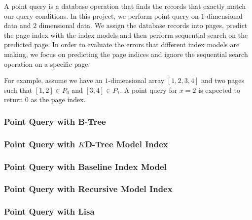 A point query is a database operation that finds the records that exactly match our query conditions. In this project, we perform point query on $1$-dimensional data and $2$ dimensional data. We assign the database records into pages, predict the page index with the index models and then perform sequential search on the predicted page. In order to evaluate the errors that different index models are making, we focus on predicting the page indices and ignore the sequential search operation on a specific page. 

\begin{mscexample}
For example, assume we have an $1$-dimensional array $[1,2,3,4]$ and two pages such that $[1,2]\in P_0$ and $[3,4]\in P_1$. A point query for $x=2$ is expected to return 0 as the page index.
\end{mscexample}

\subsubsection{Point Query with B-Tree}



\subsubsection{Point Query with $K$D-Tree Model Index}



\subsubsection{Point Query with Baseline Index Model}



\subsubsection{Point Query with Recursive Model Index}



\subsubsection{Point Query with Lisa}


